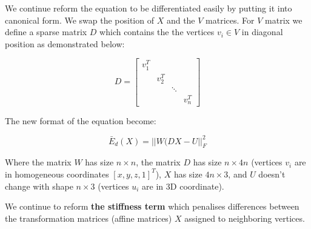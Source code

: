 \documentclass[../structure.tex]{subfiles}
\begin{document}
We continue reform the equation to be differentiated easily by putting it into canonical form. We swap the position of $X$ and the $V$ matrices. For $V$ matrix we define a sparse matrix $D$ which contains the the vertices $v_{i} \in V$ in diagonal position as demonstrated below:
 
\begin{equation}
D = 
\begin{bmatrix}
v_{1}^T & & & \\
 & v_{2}^T & & \\
 & & \ddots & \\
 & & & v_{n}^T 
\end{bmatrix}
\end{equation} 

The new format of the equation become:

\begin{equation}
\bar{E}_{d}(X) = ||W(DX-U||_{F}^2
\end{equation}

Where the matrix $W$ has size $n\times n$, the matrix $D$ has size $n\times 4n$ (vertices $v_{i}$ are in homogeneous coordinates $[x,y,z,1]^T$), $X$ has size $4n\times 3$, and $U$ doesn't change with shape $n\times 3$ (vertices $u_{i}$ are in 3D coordinate).

We continue to reform \textbf{the stiffness term} which penalises differences between the transformation matrices (affine matrices) $X$ assigned to neighboring vertices.
\end{document}
